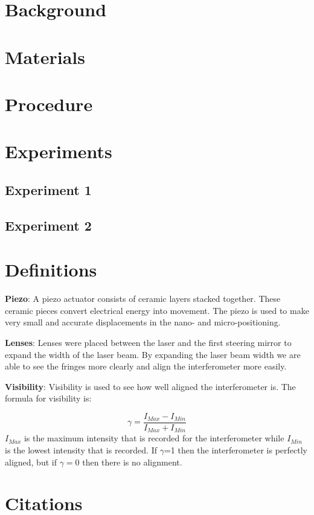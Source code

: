 \documentclass[twocolumn]{article}
\begin{document}
  


 
 \tableofcontents



\section{Background}

 

\section{Materials}
		
\section{Procedure}
		
\section{Experiments}
	\subsection{Experiment 1}
	\subsection{Experiment 2}
\appendix
\section{Definitions}

\textbf{Piezo}:
    A piezo actuator consists of ceramic layers stacked together. These ceramic pieces convert electrical energy into movement. The piezo is used to make very small and accurate displacements in the nano- and micro-positioning.

\textbf{Lenses}:
    Lenses were placed between the laser and the first steering mirror to expand the width of the laser beam. By expanding the laser beam width we are able to see the fringes more clearly and align the interferometer more easily.
    
%
\textbf{Visibility}:
    Visibility is used to see how well aligned the interferometer is. The formula for visibility is:

     \begin{equation}\label{eqn:Visibility}  
        \gamma= \frac{I_{Max} - I_{Min}}{I_{Max} + I_{Min}}
     \end{equation}    
%
$I_{Max}$ is the maximum intensity that is recorded for the interferometer while $I_{Min}$ is the lowest intensity that is recorded.  If $\gamma$=1 then the interferometer is perfectly aligned, but if $\gamma=0$ then there is no alignment. 

\section{Citations}

 
\end{document}
